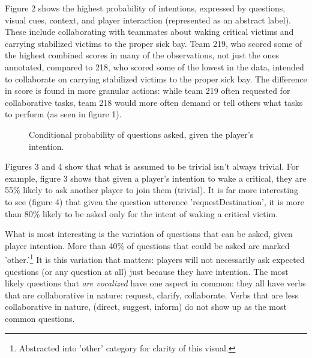 Figure 2 shows the highest probability of intentions, expressed by questions, visual cues, context, and player interaction (represented as an abstract label). These include collaborating with teammates about waking critical victims and carrying stabilized victims to the proper sick bay. Team 219, who scored some of the highest combined scores in many of the observations, not just the ones annotated, compared to 218, who scored some of the lowest in the data, intended to collaborate on carrying stabilized victims to the proper sick bay. The difference in score is found in more granular actions: while team 219 often requested for collaborative tasks, team 218 would more often demand or tell others what tasks to perform (as seen in figure 1).

\clearpage



\begin{figure}[h!]
    \centering
    \caption{Conditional probability of questions asked, given the player's intention.}
\end{figure}

Figures 3 and 4 show that what is assumed to be trivial isn't always trivial. For example, figure 3 shows that given a player's intention to wake a critical, they are 55\% likely to ask another player to join them (trivial). It is far more interesting to see (figure 4) that given the question utterence 'requestDestination', it is more than 80\% likely to be asked only for the intent of waking a critical victim.

What is most interesting is the variation of questions that can be asked, given player intention. More than 40\% of questions that could be asked are marked 'other.'\footnote{Abstracted into 'other' category for clarity of this visual.} It is this variation that matters: players will not necessarily ask expected questions (or any question at all) just because they have intention. The most likely questions that \emph{are vocalized} have one aspect in common: they all have verbs that are collaborative in nature: request, clarify, collaborate. Verbs that are less collaborative in nature, (direct, suggest, inform) do not show up as the most common questions.

